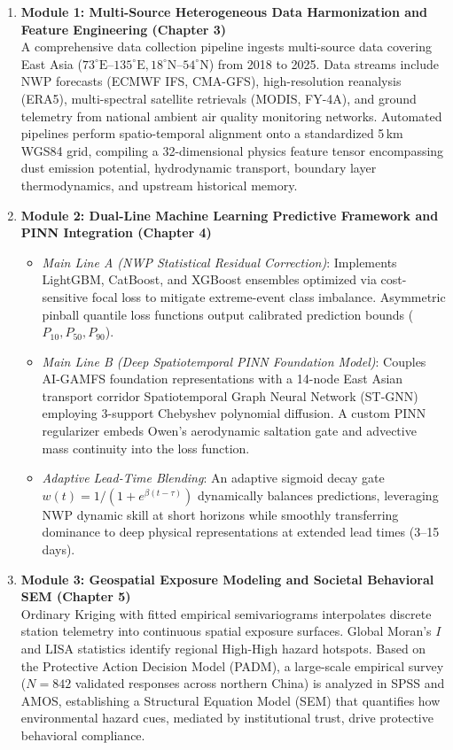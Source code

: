\begin{enumerate}
    \item \textbf{Module 1: Multi-Source Heterogeneous Data Harmonization and Feature Engineering (Chapter 3)} \\
    A comprehensive data collection pipeline ingests multi-source data covering East Asia ($73^\circ\text{E}\text{--}135^\circ\text{E}, 18^\circ\text{N}\text{--}54^\circ\text{N}$) from 2018 to 2025. Data streams include NWP forecasts (ECMWF IFS, CMA-GFS), high-resolution reanalysis (ERA5), multi-spectral satellite retrievals (MODIS, FY-4A), and ground telemetry from national ambient air quality monitoring networks. Automated pipelines perform spatio-temporal alignment onto a standardized 5\,km WGS84 grid, compiling a 32-dimensional physics feature tensor encompassing dust emission potential, hydrodynamic transport, boundary layer thermodynamics, and upstream historical memory.

    \item \textbf{Module 2: Dual-Line Machine Learning Predictive Framework and PINN Integration (Chapter 4)} \\
    \begin{itemize}
        \item \textit{Main Line A (NWP Statistical Residual Correction)}: Implements LightGBM, CatBoost, and XGBoost ensembles optimized via cost-sensitive focal loss to mitigate extreme-event class imbalance. Asymmetric pinball quantile loss functions output calibrated prediction bounds ($P_{10}, P_{50}, P_{90}$).
        \item \textit{Main Line B (Deep Spatiotemporal PINN Foundation Model)}: Couples AI-GAMFS foundation representations with a 14-node East Asian transport corridor Spatiotemporal Graph Neural Network (ST-GNN) employing 3-support Chebyshev polynomial diffusion. A custom PINN regularizer embeds Owen's aerodynamic saltation gate and advective mass continuity into the loss function.
        \item \textit{Adaptive Lead-Time Blending}: An adaptive sigmoid decay gate $w(t) = 1 / (1 + e^{\beta (t - \tau)})$ dynamically balances predictions, leveraging NWP dynamic skill at short horizons while smoothly transferring dominance to deep physical representations at extended lead times (3--15 days).
    \end{itemize}

    \item \textbf{Module 3: Geospatial Exposure Modeling and Societal Behavioral SEM (Chapter 5)} \\
    Ordinary Kriging with fitted empirical semivariograms interpolates discrete station telemetry into continuous spatial exposure surfaces. Global Moran's $I$ and LISA statistics identify regional High-High hazard hotspots. Based on the Protective Action Decision Model (PADM), a large-scale empirical survey ($N=842$ validated responses across northern China) is analyzed in SPSS and AMOS, establishing a Structural Equation Model (SEM) that quantifies how environmental hazard cues, mediated by institutional trust, drive protective behavioral compliance.


\end{enumerate}
